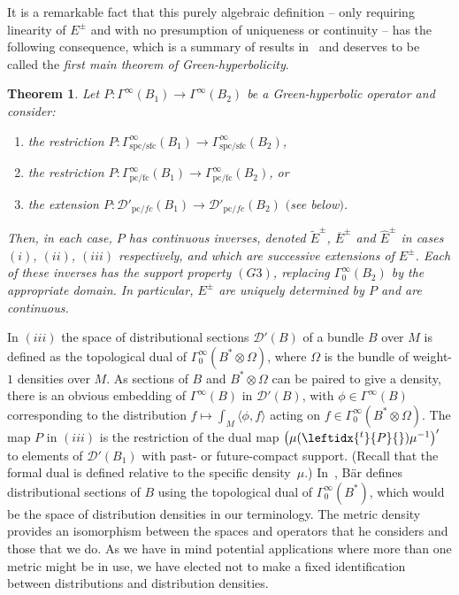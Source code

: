 \documentclass[pdftex]{sigma}
\numberwithin{equation}{section}
\newtheorem{Theorem}{Theorem}[section]
\newcommand{\fc}{\mathrm{fc}}
\newcommand{\pc}{\mathrm{pc}}
\newcommand{\sfc}{\mathrm{sfc}}
\newcommand{\spc}{\mathrm{spc}}
\newcommand{\DD}{{\mathscr D}}
\newcommand{\adj}[1]{\leftidx{^{t}}{#1}{}}
\renewcommand{\theenumi}{(\alph{enumi})}
\begin{document}
 It is a remarkable fact that this purely algebraic definition -- only requiring linearity of $E^\pm$ and with no presumption of uniqueness or continuity -- has the following consequence, which is a summary of results in~\cite[Sections 3 and 4]{Baer:2015} and deserves to be called the \emph{first main theorem of Green-hyperbolicity}.
 \begin{Theorem}\label{thm:GHbasics}
 	Let $P\colon\Gamma^\infty(B_1)\to \Gamma^\infty(B_2)$ be a Green-hyperbolic operator and consider:
 	\begin{enumerate}\renewcommand{\theenumi}{(\roman{enumi})}\itemsep=0pt
 		\item[$(i)$] the restriction $P\colon\Gamma^\infty_{\spc/\sfc}(B_1)\to\Gamma^\infty_{\spc/\sfc}(B_2)$,
 		\item[$(ii)$] the restriction $P\colon\Gamma^\infty_{\pc/\fc}(B_1)\to\Gamma^\infty_{\pc/\fc}(B_2)$, or
 		\item[$(iii)$] the extension $P\colon\DD'_{\pc/fc}(B_1)\to\DD'_{\pc/fc}(B_2)$ $($see below$)$.
 	\end{enumerate}
 	Then, in each case, $P$ has continuous inverses, denoted
 	$\tilde{E}^\pm$, $\overline{E}^\pm$ and $\widehat{E}^\pm$ in cases
 	$(i)$, $(ii)$, $(iii)$ respectively, and which are successive extensions of $E^\pm$. Each of these inverses has the support property $(G3)$, replacing
 	$\Gamma_0^\infty(B_2)$ by the appropriate domain. In particular,
 	$E^\pm$ are uniquely determined by $P$ and are continuous.
 \end{Theorem}	
 In $(iii)$ the space of distributional sections $\DD'(B)$ of a bundle $B$ over $M$ is defined
 as the topological dual of $\Gamma_0^\infty(B^*\otimes\Omega)$, where $\Omega$ is the bundle of weight-$1$ densities over $M$. As sections of $B$ and $B^*\otimes\Omega$ can be paired to give a density, there is an obvious embedding of $\Gamma^\infty(B)$ in $\DD'(B)$, with $\phi\in\Gamma^\infty(B)$ corresponding to the distribution
 $f\mapsto \int_M \langle \phi,f\rangle$ acting on $f\in \Gamma_0^\infty(B^*\otimes\Omega)$.
 The map $P$ in $(iii)$ is the restriction of the dual map
 $\big(\mu(\adj{P})\mu^{-1}\big)'$ to elements of $\DD'(B_1)$ with past- or future-compact support.
 (Recall that the formal dual is defined relative to the specific density~$\mu$.)
 In~\cite{Baer:2015}, B\"ar defines distributional sections of $B$ using
 the topological dual of $\Gamma_0^\infty(B^*)$, which would be the space of distribution densities in our terminology. The metric density
 provides an isomorphism between the spaces and operators that he considers and those that we do. As we have in mind potential applications where more than one metric might be in use, we have elected not to make a fixed identification between distributions and distribution densities.
\end{document}
